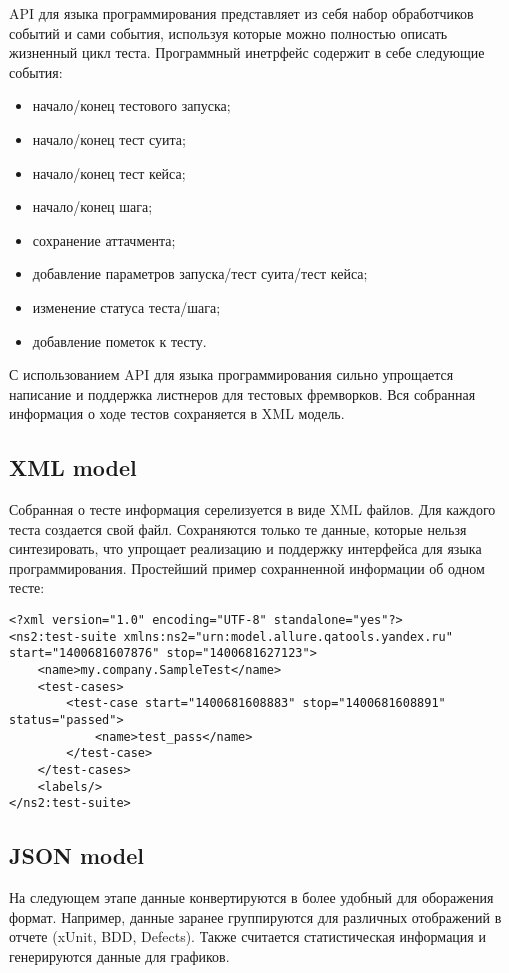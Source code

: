API для языка программирования представляет из себя набор обработчиков событий и сами события, используя которые можно полностью описать жизненный цикл теста. Программный инетрфейс содержит в себе следующие события:

\begin{itemize}
\item начало/конец тестового запуска;
\item начало/конец тест суита;
\item начало/конец тест кейса;
\item начало/конец шага;
\item сохранение аттачмента;
\item добавление параметров запуска/тест суита/тест кейса;
\item изменение статуса теста/шага;
\item добавление пометок к тесту.
\end{itemize}

С использованием API для языка программирования сильно упрощается написание и поддержка листнеров для тестовых фремворков. Вся собранная информация о ходе тестов сохраняется в XML модель. 

\subsection{XML model}

Собранная о тесте информация серелизуется в виде XML файлов. Для каждого теста создается свой файл. Сохраняются только те данные, которые нельзя синтезировать, что упрощает реализацию и поддержку интерфейса для языка программирования. Простейший пример сохранненной информации об одном тесте:

\begin{lstlisting}[style=XML]
<?xml version="1.0" encoding="UTF-8" standalone="yes"?>
<ns2:test-suite xmlns:ns2="urn:model.allure.qatools.yandex.ru" start="1400681607876" stop="1400681627123">
    <name>my.company.SampleTest</name>
    <test-cases>
        <test-case start="1400681608883" stop="1400681608891" status="passed">
            <name>test_pass</name>
        </test-case>
    </test-cases>
    <labels/>
</ns2:test-suite>
\end{lstlisting}

\subsection{JSON model}

На следующем этапе данные конвертируются в более удобный для оборажения формат. Например, данные заранее группируются для различных отображений в отчете (xUnit, BDD, Defects). Также считается статистическая информация и генерируются данные для графиков.

